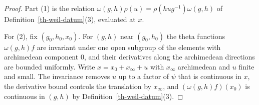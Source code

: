 \begin{proof}
Part (1) is the relation $\omega(g,h)\rho(u)=\rho(hug^{-1})\omega(g,h)$ of
Definition~\ref{th-weil-datum}(3), evaluated at $x$.

For (2), fix $(g_0,h_0,x_0)$. For $(g,h)$ near $(g_0,h_0)$ the theta functions
$\omega(g,h)f$ are invariant under one open subgroup of the elements with
archimedean component $0$, and their derivatives along the archimedean
directions are bounded uniformly. Write $x=x_0+x_\infty+u$ with $x_\infty$
archimedean and $u$ finite and small. The invariance removes $u$ up to a
factor of $\psi$ that is continuous in $x$, the derivative bound controls the
translation by $x_\infty$, and $(\omega(g,h)f)(x_0)$ is continuous in $(g,h)$ by
Definition~\ref{th-weil-datum}(3).


\end{proof}
